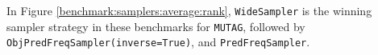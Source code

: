 In Figure \ref{benchmark:samplers:average:rank}, \texttt{WideSampler} is the winning
sampler strategy in these benchmarks for \texttt{MUTAG}, followed by
\texttt{ObjPredFreqSampler(inverse=True)}, and \texttt{PredFreqSampler}.

